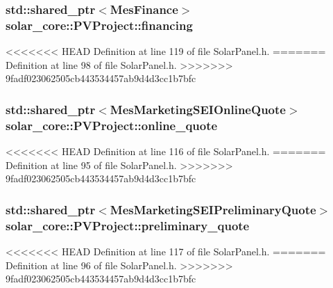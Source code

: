 \subsubsection[{financing}]{\setlength{\rightskip}{0pt plus 5cm}std\+::shared\+\_\+ptr$<${\bf Mes\+Finance}$>$ solar\+\_\+core\+::\+P\+V\+Project\+::financing}\label{classsolar__core_1_1_p_v_project_adf809769d8d38859f2f766fb5332b946}


<<<<<<< HEAD
Definition at line 119 of file Solar\+Panel.\+h.
=======
Definition at line 98 of file Solar\+Panel.\+h.
>>>>>>> 9fadf023062505cb443534457ab9d4d3cc1b7bfc

\hypertarget{classsolar__core_1_1_p_v_project_ae7998ae898c0230fbde18818cfd088a1}{}
\subsubsection[{online\+\_\+quote}]{\setlength{\rightskip}{0pt plus 5cm}std\+::shared\+\_\+ptr$<${\bf Mes\+Marketing\+S\+E\+I\+Online\+Quote}$>$ solar\+\_\+core\+::\+P\+V\+Project\+::online\+\_\+quote}\label{classsolar__core_1_1_p_v_project_ae7998ae898c0230fbde18818cfd088a1}


<<<<<<< HEAD
Definition at line 116 of file Solar\+Panel.\+h.
=======
Definition at line 95 of file Solar\+Panel.\+h.
>>>>>>> 9fadf023062505cb443534457ab9d4d3cc1b7bfc

\hypertarget{classsolar__core_1_1_p_v_project_a5d75e9dfe664f7307b0dc24c1f00d8a9}{}
\subsubsection[{preliminary\+\_\+quote}]{\setlength{\rightskip}{0pt plus 5cm}std\+::shared\+\_\+ptr$<${\bf Mes\+Marketing\+S\+E\+I\+Preliminary\+Quote}$>$ solar\+\_\+core\+::\+P\+V\+Project\+::preliminary\+\_\+quote}\label{classsolar__core_1_1_p_v_project_a5d75e9dfe664f7307b0dc24c1f00d8a9}


<<<<<<< HEAD
Definition at line 117 of file Solar\+Panel.\+h.
=======
Definition at line 96 of file Solar\+Panel.\+h.
>>>>>>> 9fadf023062505cb443534457ab9d4d3cc1b7bfc

